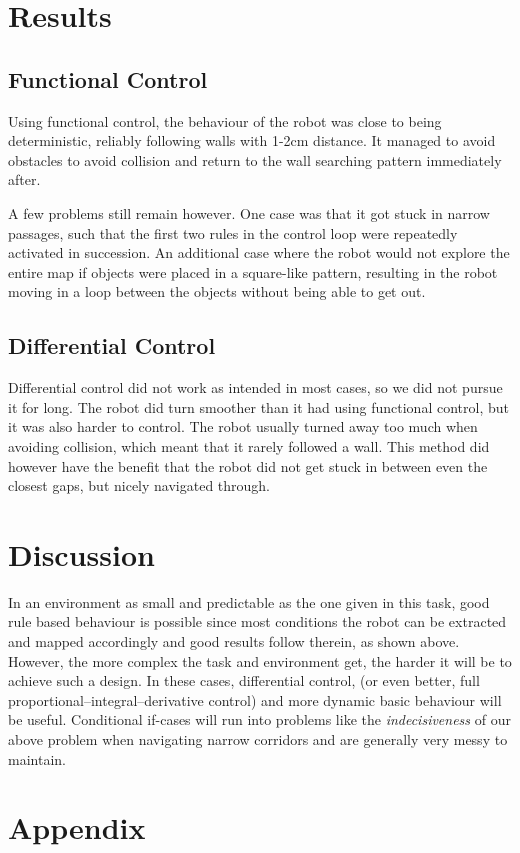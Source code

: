\documentclass[paper=a4, fontsize=12pt]{scrartcl}	%
\numberwithin{equation}{section}		%
\numberwithin{figure}{section}			%
\numberwithin{table}{section}				%
\begin{document}
\section{Results}
\subsection{Functional Control}
Using functional control, the behaviour of the robot was close to being deterministic, reliably following walls with 1-2cm distance. It managed to avoid obstacles to avoid collision and return to the wall searching pattern immediately after.

A few problems still remain however. One case was that it got stuck in narrow passages, such that the first two rules in the control loop were repeatedly activated in succession. An additional case where the robot would not explore the entire map if objects were placed in a square-like pattern, resulting in the robot moving in a loop between the objects without being able to get out.
\subsection{Differential Control}
Differential control did not work as intended in most cases, so we did not pursue it for long. The robot did turn smoother than it had using functional control, but it was also harder to control. The robot usually turned away too much when avoiding collision, which meant that it rarely followed a wall. This method did however have the benefit that the robot did not get stuck in between even the closest gaps, but nicely navigated through.
\section{Discussion}
In an environment as small and predictable as the one given in this task, good rule based behaviour is possible since most conditions the robot can be extracted and mapped accordingly and good results follow therein, as shown above. However, the more complex the task and environment get, the harder it will be to achieve such a design. In these cases, differential control, (or even better, full proportional–integral–derivative control) and more dynamic basic behaviour will be useful. Conditional if-cases will run into problems like the \emph{indecisiveness} of our above problem when navigating narrow corridors and are generally very messy to maintain.
\section{Appendix}
\end{document}
